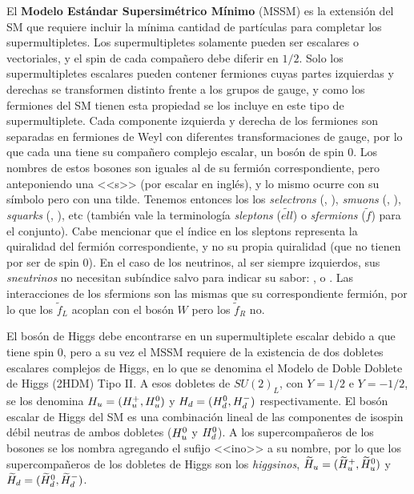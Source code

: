 El \textbf{Modelo Estándar Supersimétrico Mínimo} (MSSM) es la extensión del SM que requiere incluir la mínima cantidad de partículas para completar los supermultipletes. Los supermultipletes solamente pueden ser escalares o vectoriales, y el spin de cada compañero debe diferir en $1/2$. Solo los supermultipletes escalares pueden contener fermiones cuyas partes izquierdas y derechas se transformen distinto frente a los grupos de gauge, y como los fermiones del SM tienen esta propiedad se los incluye en este tipo de supermultiplete. Cada componente izquierda y derecha de los fermiones son separadas en fermiones de Weyl con diferentes transformaciones de gauge, por lo que cada una tiene su compañero complejo escalar, un bosón de spin 0. Los nombres de estos bosones son iguales al de su fermión correspondiente, pero anteponiendo una <<s>> (por escalar en inglés), y lo mismo ocurre con su símbolo pero con una tilde. Tenemos entonces los los \textit{selectrons} (\selL, \selR), \textit{smuons} (\smuL, \smuR), \textit{squarks} (\squarkL, \squarkR), etc (también vale la terminología \textit{sleptons} ($\tilde{ell}$) o \textit{sfermions} ($\tilde{f}$) para el conjunto). Cabe mencionar que el índice en los sleptons representa la quiralidad del fermión correspondiente, y no su propia quiralidad (que no tienen por ser de spin 0). En el caso de los neutrinos, al ser siempre izquierdos, sus \textit{sneutrinos} no necesitan subíndice salvo para indicar su sabor: \snue, \snumu o \snutau. Las interacciones de los sfermions son las mismas que su correspondiente fermión, por lo que los $\tilde{f}_L$ acoplan con el bosón $W$ pero los $\tilde{f}_R$ no.

El bosón de Higgs debe encontrarse en un supermultiplete escalar debido a que tiene spin 0, pero a su vez el MSSM requiere de la existencia de dos dobletes escalares complejos de Higgs, en lo que se denomina el Modelo de Doble Doblete de Higgs (2HDM) Tipo II. A esos dobletes de $SU(2)_L$, con $Y=1/2$ e $Y=-1/2$, se los denomina $H_u=(H_u^+, H_u^0)$ y $H_d=(H_d^0, H_d^-)$ respectivamente. El bosón escalar de Higgs del SM es una combinación lineal de las componentes de isospin débil neutras de ambos dobletes ($H_u^0$ y $H_d^0$). A los supercompañeros de los bosones se los nombra agregando el sufijo <<ino>> a su nombre, por lo que los supercompañeros de los dobletes de Higgs son los \textit{higgsinos}, $\widetilde{H}_u=(\widetilde{H}_u^+, \widetilde{H}_u^0)$ y $\widetilde{H}_d=(\widetilde{H}_d^0, \widetilde{H}_d^-)$.

